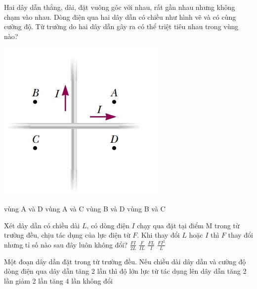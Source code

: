 \begin{ex}
	Hai dây dẫn thẳng, dài, đặt vuông góc với nhau, rất gần nhau nhưng không chạm vào nhau. Dòng điện qua hai dây dẫn có chiều như hình vẽ và có cùng cường độ. Từ trường do hai dây dẫn gây ra có thể triệt tiêu nhau trong vùng nào?
	\begin{center}
		\includegraphics[width=0.3\linewidth]{../figs/VN12-Y24-PH-SYL-017P-8}
	\end{center}
	\choice
	{vùng A và D}
	{\True vùng A và C}
	{vùng B và D}
	{vùng B và C}
	\loigiai{}
\end{ex}
\begin{ex}
	Xét dây dẫn có chiều dài $L$, có dòng điện $I$ chạy qua đặt tại điểm M trong từ trường đều, chịu tác dụng của lực điện từ $F$. Khi thay đổi $L$ hoặc $I$ thì $F$ thay đổi nhưng tỉ số nào sau đây luôn không đổi?
	\choice
	{$\frac{FI}{2L}$}
	{\True $\frac{F}{IL}$}
	{$\frac{FL}{I}$}
	{$\frac{FI^2}{L}$}
	\loigiai{}
\end{ex}
\begin{ex}
Một đoạn dây dẫn đặt trong từ trường đều. Nếu chiều dài dây dẫn và cường độ dòng điện qua dây dẫn tăng 2 lần thì độ lớn lực từ tác dụng lên dây dẫn	
	\choice
	{tăng 2 lần}
	{giảm 2 lần}
	{\True tăng 4 lần}
	{không đổi}
\end{ex}

